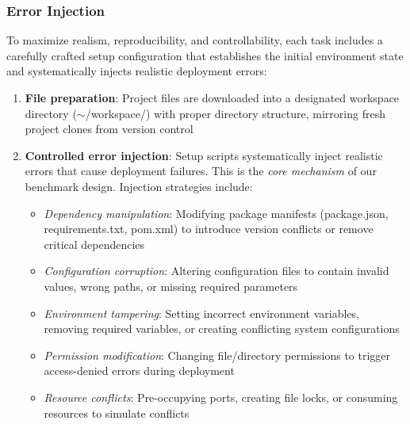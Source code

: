 
\subsubsection{Error Injection}

To maximize realism, reproducibility, and controllability, each task includes a carefully crafted setup configuration that establishes the initial environment state and systematically injects realistic deployment errors:

\begin{enumerate}
\item \textbf{File preparation}: Project files are downloaded into a designated workspace directory ($\sim$/workspace/) with proper directory structure, mirroring fresh project clones from version control

\item \textbf{Controlled error injection}: Setup scripts systematically inject realistic errors that cause deployment failures. This is the \textit{core mechanism} of our benchmark design. Injection strategies include:
\begin{itemize}
    \item \textit{Dependency manipulation}: Modifying package manifests (package.json, requirements.txt, pom.xml) to introduce version conflicts or remove critical dependencies
    \item \textit{Configuration corruption}: Altering configuration files to contain invalid values, wrong paths, or missing required parameters
    \item \textit{Environment tampering}: Setting incorrect environment variables, removing required variables, or creating conflicting system configurations
    \item \textit{Permission modification}: Changing file/directory permissions to trigger access-denied errors during deployment
    \item \textit{Resource conflicts}: Pre-occupying ports, creating file locks, or consuming resources to simulate conflicts
\end{itemize}



\end{enumerate}


